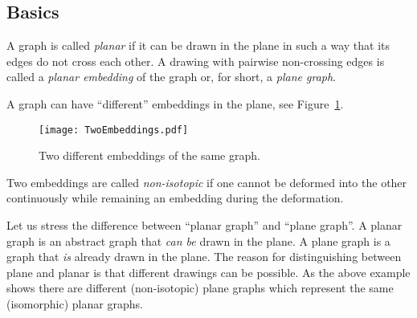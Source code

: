 \begin{page}
\setcounter{section}{3}
\setcounter{subsection}{1}
\setcounter{dfn}{0}
\label{portion:319}

\subsection{Basics}

\end{page}

\begin{page}
\setcounter{section}{3}
\setcounter{subsection}{1}
\setcounter{dfn}{1}
\label{portion:321}

\begin{dfn}
A graph is called \emph{planar} if it can be drawn in the plane in such a way that its edges do not cross each other.
A drawing with pairwise non-crossing edges is called a \emph{planar embedding} of the graph or, for short, a \emph{plane graph}.
\end{dfn}

\end{page}

\begin{page}
\setcounter{section}{3}
\setcounter{subsection}{1}
\setcounter{dfn}{1}
\label{portion:322}


A graph can have ``different'' embeddings in the plane, see Figure~\ref{fig:TwoEmbeddings}.

\begin{figure}[ht]
\begin{center}
\texttt{[image: TwoEmbeddings.pdf]}
\end{center}
\caption{Two different embeddings of the same graph.}
\label{fig:TwoEmbeddings}
\end{figure}

Two embeddings are called \emph{non-isotopic} if one cannot be deformed into the other continuously
while remaining an embedding during the deformation.


\end{page}

\begin{page}
\setcounter{section}{3}
\setcounter{subsection}{1}
\setcounter{dfn}{2}
\label{portion:324}

\begin{rem}
Let us stress the difference between ``planar graph'' and ``plane graph''.
A planar graph is an abstract graph that \emph{can be} drawn in the plane.
A plane graph is a graph that \emph{is} already drawn in the plane.
The reason for distinguishing between plane and planar is that different drawings can be possible.
As the above example shows there are different (non-isotopic) plane graphs which represent the same (isomorphic) planar graphs.
\end{rem}

\end{page}

